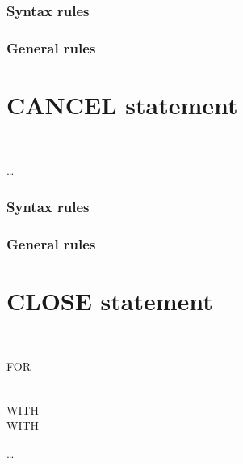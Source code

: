 \subsubsection{Syntax rules}

\subsubsection{General rules}

\section{CANCEL statement}

\begin{syntax}
  \begin{1=}
    \identifier \\
    \literal
  \end{1=} \ldots
\end{syntax}

\subsubsection{Syntax rules}

\subsubsection{General rules}

\section{CLOSE statement}

\begin{syntax}
  \begin{1=}
    \filename
    \begin{0-1}
      \begin{1=}
         \\
      \end{1=}
      \begin{0-1}
        FOR 
      \end{0-1} \\

      WITH   \\
      WITH 
    \end{0-1}
  \end{1=} \ldots
\end{syntax}

